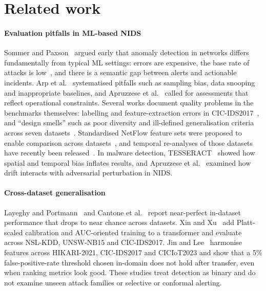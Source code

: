 \section{Related work}\label{sec:related}

\paragraph{Evaluation pitfalls in ML-based NIDS} Sommer and Paxson~\cite{sommer2010outside} argued early that anomaly detection in networks differs fundamentally from typical ML settings: errors are expensive, the base rate of attacks is low~\cite{axelsson2000base}, and there is a semantic gap between alerts and actionable incidents. Arp et al.~\cite{arp2022dos} systematised pitfalls such as sampling bias, data snooping and inappropriate baselines, and Apruzzese et al.~\cite{apruzzese2023sok} called for assessments that reflect operational constraints. Several works document quality problems in the benchmarks themselves: labelling and feature-extraction errors in CIC-IDS2017~\cite{engelen2021troubleshooting,lanvin2023errors}, and ``design smells'' such as poor diversity and ill-defined generalisation criteria across seven datasets~\cite{flood2024bad}. Standardised NetFlow feature sets were proposed to enable comparison across datasets~\cite{sarhan2021netflow,sarhan2022standard,sarhan2022evaluating}, and temporal re-analyses of those datasets have recently been released~\cite{luay2025temporal}. In malware detection, TESSERACT~\cite{pendlebury2019tesseract} showed how spatial and temporal bias inflates results, and Apruzzese et al.~\cite{apruzzese2024adversarial} examined how drift interacts with adversarial perturbation in NIDS.

\paragraph{Cross-dataset generalisation} Layeghy and Portmann~\cite{layeghy2023explainable} and Cantone et al.~\cite{cantone2024cross} report near-perfect in-dataset performance that drops to near chance across datasets. Xin and Xu~\cite{xin2025crossdataset} add Platt-scaled calibration and AUC-oriented training to a transformer and evaluate across NSL-KDD, UNSW-NB15 and CIC-IDS2017. Jin and Lee~\cite{jin2026benchmark} harmonise features across HIKARI-2021, CIC-IDS2017 and CICIoT2023 and show that a 5\% false-positive-rate threshold chosen in-domain does not hold after transfer, even when ranking metrics look good. These studies treat detection as binary and do not examine unseen attack families or selective or conformal alerting.

